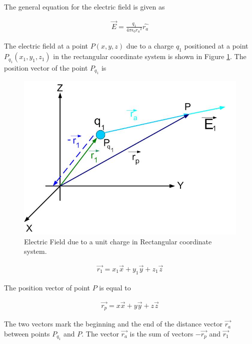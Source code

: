 \documentclass{ximera}
\begin{document}
The general equation for the electric field is given as



\begin{eqnarray}
\vec{E}=\frac{q_1}{4 \pi \epsilon_{0} {r_a}^2} \hat{r_a} \label{genfield}
\end{eqnarray}

The electric field at a point $P(x,y,z)$ due to a charge $q_1$ positioned at a point $P_{q_1}(x_1, y_1, z_1 )$  in the rectangular coordinate system is shown in Figure \ref{singlecharge1}. The position vector of the point $P_{q_1}$  is 


\begin{figure}[htbp]
\begin{center}
\includegraphics[scale=0.5]{../jpg/singlechargecartcoord.jpg}
\end{center}
\caption{Electric Field due to a unit charge in Rectangular coordinate system.}
\label{singlecharge1}
\end{figure}





\begin{eqnarray}
\vec{r_1}=x_1 \vec{x} + y_1 \vec{y} +z_1 \vec{z}
\end{eqnarray}

The position vector of point $P$ is equal to

\begin{eqnarray}
\vec{r_p}=x\vec{x} + y \vec{y} +z \vec{z}
\end{eqnarray}

The two vectors mark the beginning and the end of the distance vector $\vec{r_a}$  between points $P_{q_1}$ and $P$. The vector  $\vec{r_a}$ is the sum of vectors $-\vec{r_p}$ and $\vec{r_1}$
\end{document}
